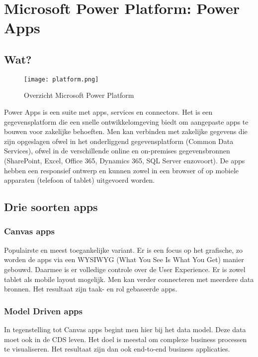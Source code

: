 \section{Microsoft Power Platform: Power Apps}
\label{sec:power-platform}

\subsection{Wat?}

\begin{figure}[h!]
    \texttt{[image: platform.png]}
    \caption{Overzicht Microsoft Power Platform \autocite{MicrosoftDocs2019a}}
    \label{fig:mspowerplatform}
\end{figure}

Power Apps is een suite met apps, services en connectors. Het is een gegevensplatform die een snelle ontwikkelomgeving biedt om aangepaste apps te bouwen voor zakelijke behoeften. Men kan verbinden met zakelijke gegevens die zijn opgeslagen ofwel in het onderliggend gegevensplatform (Common Data Services), ofwel in de verschillende online en on-premises gegevensbronnen (SharePoint, Excel, Office 365, Dynamics 365, SQL Server enzovoort). De apps hebben een responsief ontwerp en kunnen zowel in een browser of op mobiele apparaten (telefoon of tablet) uitgevoerd worden. \autocite{MicrosoftDocs2019}

\subsection{Drie soorten apps}

\subsubsection{Canvas apps}

Populairste en meest toegankelijke variant. Er is een focus op het grafische, zo worden de apps via een WYSIWYG (What You See Is What You Get) manier gebouwd. Daarmee is er volledige controle over de User Experience. Er is zowel tablet als mobile layout mogelijk. Men kan verder connecteren met meerdere data bronnen. Het resultaat zijn taak- en rol gebaseerde apps. \autocite{PragmaticWorks2019}

\subsubsection{Model Driven apps}

In tegenstelling tot Canvas apps begint men hier bij het data model. Deze data moet ook in de CDS leven. Het doel is meestal om complexe business processen te visualiseren. Het resultaat zijn dan ook end-to-end business applicaties. \autocite{PragmaticWorks2019}

